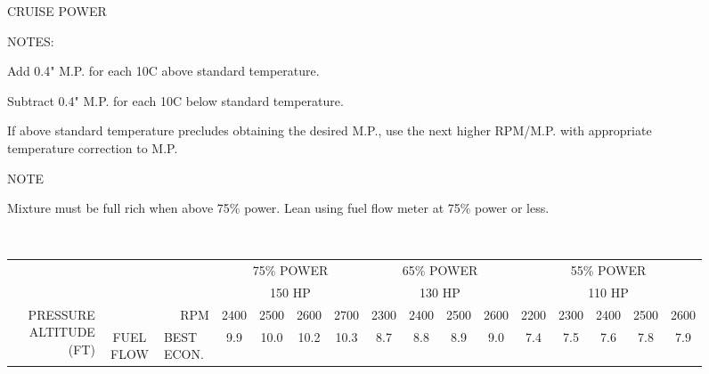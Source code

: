 \settowidth{\colOne}{PRESSURE}
\settowidth{\colTwo}{FLOW}
\settowidth{\colThree}{BEST POWER}

\begin{sidewaysfigure}[t]
\begin{center}
\begin{perfhdr}CRUISE POWER
\end{perfhdr}
\begin{minipage}{9in}
\begin{minipage}{5in}
NOTES:
\begin{enumerate*}
\item Add 0.4" M.P. for each 10\textdegree C above standard temperature.  
\item Subtract 0.4" M.P. for each 10\textdegree C below standard temperature.
\item If above standard temperature precludes obtaining the desired M.P., use the next higher RPM/M.P. with appropriate temperature correction to M.P.
\end{enumerate*}

\end{minipage}
\hfill
\begin{boxedminipage}{3in}
\begin{center}NOTE\end{center}
Mixture must be full rich when above 75\% power. Lean using fuel flow meter at 75\% power or less.
\end{boxedminipage}
\end{minipage}\\
\vspace{\perfnoteskip}
\begin{tabular}{|r|cc||c|c|c|c||c|c|c|c||c|c|c|c|c|}
\hline
&&&\multicolumn{4}{c||}{75\% POWER}&\multicolumn{4}{c||}{65\% POWER}&\multicolumn{5}{c|}{55\% POWER}\\
&&&\multicolumn{4}{c||}{150 HP}&\multicolumn{4}{c||}{130 HP}&\multicolumn{5}{c|}{110 HP}\\
\hline
\multirow{4}{\colOne}{\centering PRESSURE ALTITUDE (FT)}&\multicolumn{2}{r||}{RPM}&
2400&2500&2600&2700&2300&2400&2500&2600&2200&2300&2400&2500&2600\\
\cline{2-16}
&\multirow{2}{\colTwo}{\centering FUEL FLOW}&\multicolumn{1}{|l||}{BEST ECON.} &9.9 &10.0 &10.2&10.3 &8.7 &8.8 &8.9 &9.0 &7.4 &7.5 &7.6 &7.8 &7.9 \\


\end{tabular}
\end{center}
\end{sidewaysfigure}
